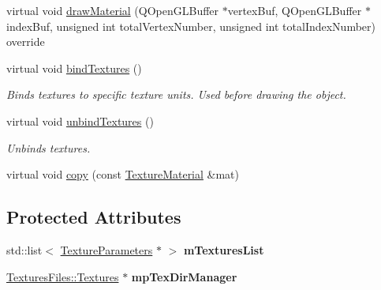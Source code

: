 \begin{DoxyCompactItemize}
\item 
virtual void \mbox{\hyperlink{class_geometry_engine_1_1_geometry_material_1_1_texture_material_a7bb3c956fa64e47b251d882890c931f9}{draw\+Material}} (Q\+Open\+G\+L\+Buffer $\ast$vertex\+Buf, Q\+Open\+G\+L\+Buffer $\ast$index\+Buf, unsigned int total\+Vertex\+Number, unsigned int total\+Index\+Number) override
\item 
\mbox{\label{class_geometry_engine_1_1_geometry_material_1_1_texture_material_aced804d28c51063e9541b88bbbb2b485}} 
virtual void \mbox{\hyperlink{class_geometry_engine_1_1_geometry_material_1_1_texture_material_aced804d28c51063e9541b88bbbb2b485}{bind\+Textures}} ()
\begin{DoxyCompactList}\small\item\em Binds textures to specific texture units. Used before drawing the object. \end{DoxyCompactList}\item 
\mbox{\label{class_geometry_engine_1_1_geometry_material_1_1_texture_material_a5122a487e0bec681fa372a808bf39f95}} 
virtual void \mbox{\hyperlink{class_geometry_engine_1_1_geometry_material_1_1_texture_material_a5122a487e0bec681fa372a808bf39f95}{unbind\+Textures}} ()
\begin{DoxyCompactList}\small\item\em Unbinds textures. \end{DoxyCompactList}\item 
virtual void \mbox{\hyperlink{class_geometry_engine_1_1_geometry_material_1_1_texture_material_a946658ad56ad140e6e5ec5d12a15affc}{copy}} (const \mbox{\hyperlink{class_geometry_engine_1_1_geometry_material_1_1_texture_material}{Texture\+Material}} \&mat)
\end{DoxyCompactItemize}
\subsection*{Protected Attributes}
\begin{DoxyCompactItemize}
\item 
\mbox{\label{class_geometry_engine_1_1_geometry_material_1_1_texture_material_ae2480940b9ea9c623ce3b68e5ccb28fe}} 
std\+::list$<$ \mbox{\hyperlink{class_geometry_engine_1_1_geometry_material_1_1_texture_parameters}{Texture\+Parameters}} $\ast$ $>$ {\bfseries m\+Textures\+List}
\item 
\mbox{\label{class_geometry_engine_1_1_geometry_material_1_1_texture_material_ae5437f3c43d11457400ea462809d5e33}} 
\mbox{\hyperlink{class_textures_files_1_1_textures}{Textures\+Files\+::\+Textures}} $\ast$ {\bfseries mp\+Tex\+Dir\+Manager}
\end{DoxyCompactItemize}
